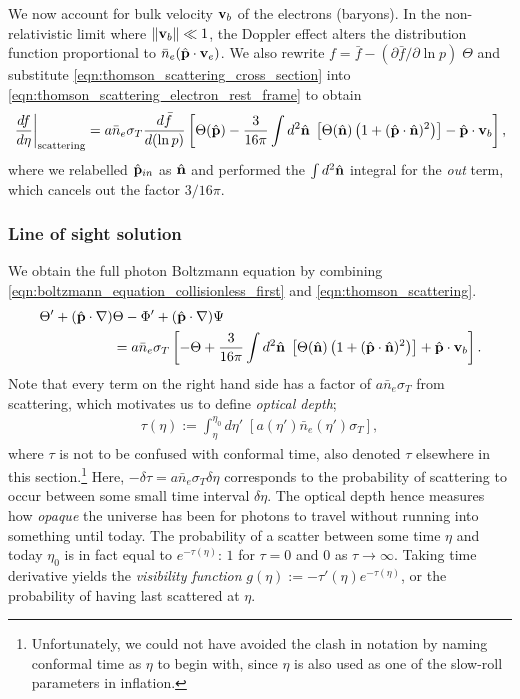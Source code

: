 We now account for bulk velocity $\mathbf{v}_b$ of the electrons (baryons). In the non-relativistic limit where $\|\mathbf{v}_b \| \ll 1$, the Doppler effect alters the distribution function proportional to $\bar{n}_e (\hat{\mathbf{p}} \cdot \mathbf{v}_e)$. We also rewrite $f = \bar{f} - (\partial\bar{f}/\partial\ln p) \; \Theta$ and substitute \eqref{eqn:thomson_scattering_cross_section} into \eqref{eqn:thomson_scattering_electron_rest_frame} to obtain
\begin{align}
	\left. \frac{df}{d\eta} \right|_\text{scattering} = a \bar{n}_e \sigma_T \frac{d\bar{f}}{d(\ln p)}  \left[ \Theta(\hat{\mathbf{p}}) - \frac{3}{16\pi} \int d^2 \hat{\mathbf{n}} \; \left[ \Theta(\hat{\mathbf{n}}) \left( 1 + (\hat{\mathbf{p}} \cdot \hat{\mathbf{n}})^2 \right) \right] - \hat{\mathbf{p}} \cdot \mathbf{v}_b \right], \label{eqn:thomson_scattering}
\end{align}
where we relabelled $\hat{\mathbf{p}}_{in}$ as $\hat{\mathbf{n}}$ and performed the $\int d^2\hat{\mathbf{n}}$ integral for the \textit{out} term, which cancels out the factor $3/16\pi$.


\subsubsection*{Line of sight solution} \label{section:line_of_sight_solution}

We obtain the full photon Boltzmann equation by combining \eqref{eqn:boltzmann_equation_collisionless_first} and \eqref{eqn:thomson_scattering}.
\begin{align}
	\Theta' + (\hat{\mathbf{p}} \cdot \nabla) &\Theta - \Phi' +(\hat{\mathbf{p}} \cdot \nabla) \Psi  \nonumber \\	
	&= a \bar{n}_e \sigma_T \left[ -\Theta + \frac{3}{16\pi} \int d^2 \hat{\mathbf{n}} \; \left[ \Theta(\hat{\mathbf{n}}) \left( 1 + (\hat{\mathbf{p}} \cdot \hat{\mathbf{n}})^2 \right) \right] + \hat{\mathbf{p}} \cdot \mathbf{v}_b \right]. \label{eqn:boltzmann_equation_1}
\end{align}
Note that every term on the right hand side has a factor of $a\bar{n}_e \sigma_T$ from scattering, which motivates us to define \textit{optical depth};
\begin{align}
	\tau(\eta) := \int_\eta^{\eta_0} d\eta'\; \left[ a(\eta') \bar{n}_e (\eta') \sigma_T \right],
\end{align}
where $\tau$ is not to be confused with conformal time, also denoted $\tau$ elsewhere in this section.\footnote{Unfortunately, we could not have avoided the clash in notation by naming conformal time as $\eta$ to begin with, since $\eta$ is also used as one of the slow-roll parameters in inflation.} Here, $-\delta\tau = a\bar{n}_e \sigma_T \delta\eta$ corresponds to the probability of scattering to occur between some small time interval $\delta\eta$. The optical depth hence measures how \textit{opaque} the universe has been for photons to travel without running into something until today. The probability of a scatter between some time $\eta$ and today $\eta_0$ is in fact equal to $e^{-\tau(\eta)}$: $1$ for $\tau=0$ and $0$ as $\tau\rightarrow\infty$. Taking time derivative yields the \textit{visibility function} $g(\eta):=-\tau'(\eta) e^{-\tau(\eta)}$, or the probability of having last scattered at $\eta$.

